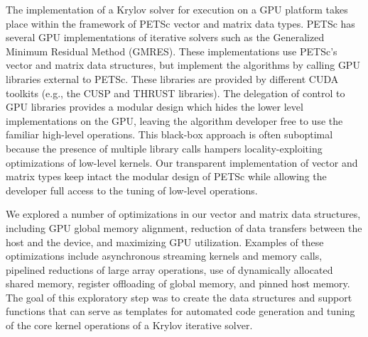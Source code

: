 \documentclass{report}
\begin{document}
The implementation of a Krylov solver for execution on a GPU platform
takes place within the framework of PETSc vector and matrix data types.
PETSc has several GPU implementations of iterative solvers such as the
Generalized Minimum Residual Method (GMRES). These implementations use
PETSc’s vector and matrix data structures, but implement the algorithms
by calling GPU libraries external to PETSc. These libraries are provided
by different CUDA toolkits (e.g., the CUSP and THRUST libraries). The
delegation of control to GPU libraries provides a modular design which
hides the lower level implementations on the GPU, leaving the algorithm
developer free to use the familiar high-level operations. This black-box
approach is often suboptimal because the presence of multiple library
calls hampers locality-exploiting optimizations of low-level kernels. Our
transparent implementation of vector and matrix types keep intact the
modular design of PETSc while allowing the developer full access to the
tuning of low-level operations.

We explored a number of optimizations in our vector and matrix data
structures, including GPU global memory alignment, reduction of data
transfers between the host and the device, and maximizing GPU
utilization. Examples of these optimizations include asynchronous
streaming kernels and memory calls, pipelined reductions of large array
operations, use of dynamically allocated shared memory, register
offloading of global memory, and pinned host memory. The goal of this
exploratory step was to create the data structures and support functions
that can serve as templates for automated code generation and tuning of
the core kernel operations of a Krylov iterative solver.
\end{document}
